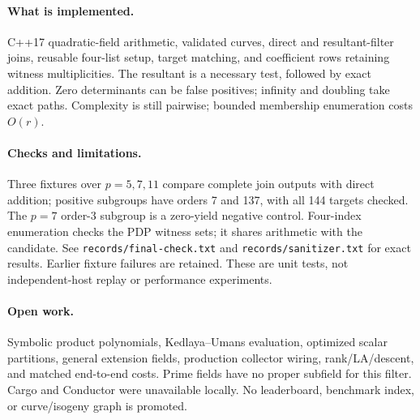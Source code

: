\documentclass[10pt]{article}
\begin{document}
\paragraph{What is implemented.} C++17 quadratic-field arithmetic, validated
curves, direct and resultant-filter joins, reusable four-list setup, target
matching, and coefficient rows retaining witness multiplicities. The
resultant is a necessary test, followed by exact addition. Zero determinants
can be false positives; infinity and doubling take exact paths. Complexity
is still pairwise; bounded membership enumeration costs $O(r)$.

\paragraph{Checks and limitations.} Three fixtures over $p=5,7,11$ compare
complete join outputs with direct addition; positive subgroups have orders
7 and 137, with all 144 targets checked. The $p=7$ order-3 subgroup is a
zero-yield negative control. Four-index enumeration checks the PDP witness
sets; it shares arithmetic with the candidate. See
\texttt{records/final-check.txt} and \texttt{records/sanitizer.txt} for
exact results. Earlier fixture failures are retained. These are unit tests,
not independent-host replay or performance experiments.

\paragraph{Open work.} Symbolic product polynomials, Kedlaya--Umans evaluation,
optimized scalar partitions, general extension fields, production collector
wiring, rank/LA/descent, and matched end-to-end costs. Prime fields have no
proper subfield for this filter. Cargo and Conductor were unavailable locally.
No leaderboard, benchmark index, or curve/isogeny graph is promoted.
\end{document}
